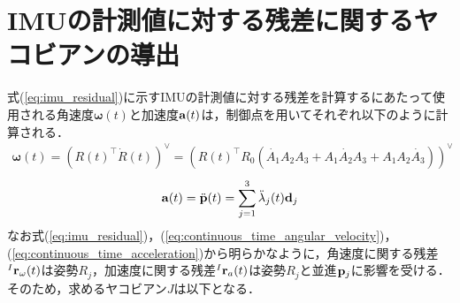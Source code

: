 \section{IMUの計測値に対する残差に関するヤコビアンの導出}

式(\ref{eq:imu_residual})に示すIMUの計測値に対する残差を計算するにあたって使用される角速度$\boldsymbol \omega(t)$と加速度${\bf a}(t)$は，制御点を用いてそれぞれ以下のように計算される．
%
\begin{align}
  \boldsymbol \omega(t)
  = \left( R(t)^{\top} \dot{ R }(t) \right)^{\vee}
  = \left( R(t)^{\top} R_{0} \left( \dot{ A_{1} } A_{2} A_{3} + A_{1} \dot{ A_{2} } A_{3} + A_{1} A_{2} \dot{ A_{3} } \right) \right)^{\vee}
  \label{eq:continuous_time_angular_velocity}
\end{align}
%
\begin{align}
  {\bf a}(t)
  =
  \ddot{ {\bf p} }(t)
  =
  \sum_{j=1}^{3} \ddot{ \lambda }_{j}(t) {\bf d}_{j}
  \label{eq:continuous_time_acceleration}
\end{align}
%
なお式(\ref{eq:imu_residual})，(\ref{eq:continuous_time_angular_velocity})，(\ref{eq:continuous_time_acceleration})から明らかなように，角速度に関する残差${}^{I}{\bf r}_{\omega}(t)$は姿勢$R_{j}$，加速度に関する残差${}^{I}{\bf r}_{a}(t)$は姿勢$R_{j}$と並進${\bf p}_{j}$に影響を受ける．
そのため，求めるヤコビアン$J$は以下となる．
%
